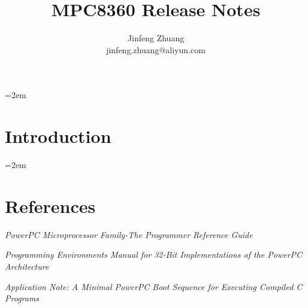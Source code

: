 \documentclass[a4paper]{article}
\title{MPC8360 Release Notes}
\author{Jinfeng Zhuang \\ jinfeng.zhuang@aliyun.com}
\date{}
\let\oldsection\section
\renewcommand{\section}{\leftskip=2em \oldsection}
\begin{document}
\maketitle

\section{Introduction}


\section{References}

\begin{itemize*}
\item \emph{PowerPC Microprocessor Family-The Programmer Reference Guide}
\item \emph{Programming Environments Manual for 32-Bit Implementations of the PowerPC Architecture}
\item \emph{Application Note: A Minimal PowerPC Boot Sequence for Executing Compiled C Programs}
\end{itemize*}
\end{document}
